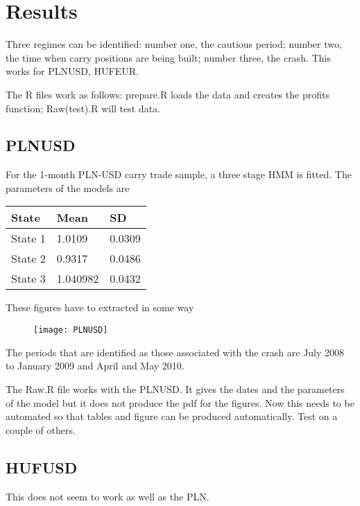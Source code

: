 \documentclass[12pt, a4paper, oneside]{article} %
\begin{document}
\section{Results}
Three regimes can be identified: number one, the cautious period; number two, the time when carry positions are being built; number three, the crash.  This works for PLNUSD, HUFEUR. 

The R files work as follows: prepare.R loads the data and creates the profits function; Raw(test).R will test data. 

\subsection{PLNUSD}
For the 1-month PLN-USD carry trade sample, a three stage HMM is fitted.  The parameters of the models are 

\begin{tabular}{l | l l}
State & Mean & SD \\
\hline
State 1 & 1.0109 & 0.0309\\
State 2 & 0.9317 & 0.0486\\
State 3 & 1.040982 & 0.0432\\
\end{tabular}

These figures have to extracted in some way 

 
\begin{figure}
\texttt{[image: PLNUSD]}
\end{figure}

The periods that are identified as those associated with the crash are July 2008 to January 2009 and April and May 2010.  

The Raw.R file works with the PLNUSD.  It gives the dates and the parameters of the model but it does not produce the pdf for the figures. Now this needs to be automated so that tables and figure can be produced automatically. Test on a couple of others. 

\subsection{HUFUSD}
This does not seem to work as well as the PLN.  
\end{document}
